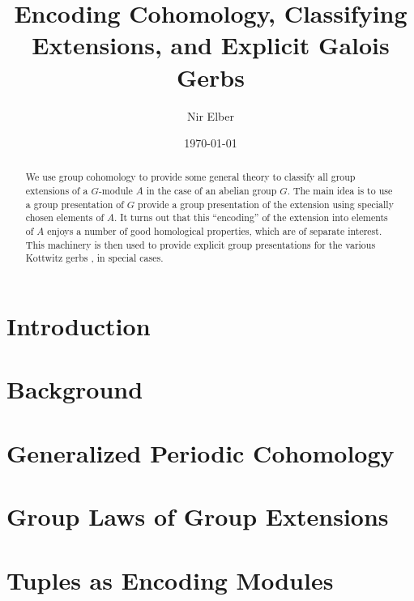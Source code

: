 \documentclass{amsart}
\title{Encoding Cohomology, Classifying Extensions, and Explicit Galois Gerbs}
\author{Nir Elber}
\date{\today}
\numberwithin{equation}{section}
\begin{document}
\maketitle

\begin{abstract}
	\noindent We use group cohomology to provide some general theory to classify all group extensions of a $ G$-module $A$ in the case of an abelian group $ G$. The main idea is to use a group presentation of $G$ provide a group presentation of the extension using specially chosen elements of $A$. It turns out that this ``encoding'' of the extension into elements of $A$ enjoys a number of good homological properties, which are of separate interest. This machinery is then used to provide explicit group presentations for the various Kottwitz gerbs \cite{kottwitz}, in special cases.
\end{abstract}

\setcounter{tocdepth}{4}
\tableofcontents

\section{Introduction} \label{sec:intro}


\section{Background} \label{sec:background}


\section{Generalized Periodic Cohomology} \label{sec:crackpot}


\section{Group Laws of Group Extensions} \label{sec:general}




\section{Tuples as Encoding Modules} \label{sec:tuplestudy}

\end{document}
